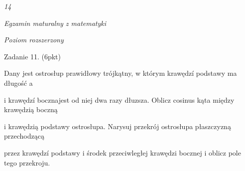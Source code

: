 \documentclass[a4paper,12pt]{article}
\begin{document}
{\it 14}

{\it Egzamin maturalny z matematyki}

{\it Poziom rozszerzony}

Zadanie 11. (6pkt)

Dany jest ostrosłup prawidłowy trójkątny, w którym krawędzí podstawy ma długość a

i krawędzí bocznajest od niej dwa razy dłuzsza. Oblicz cosinus kąta między krawędzią boczną

i krawędzią podstawy ostrosłupa. Narysuj przekrój ostrosłupa płaszczyzną przechodzącą

przez krawędzí podstawy i środek przeciwległej krawędzi bocznej i oblicz pole tego przekroju.
\end{document}
